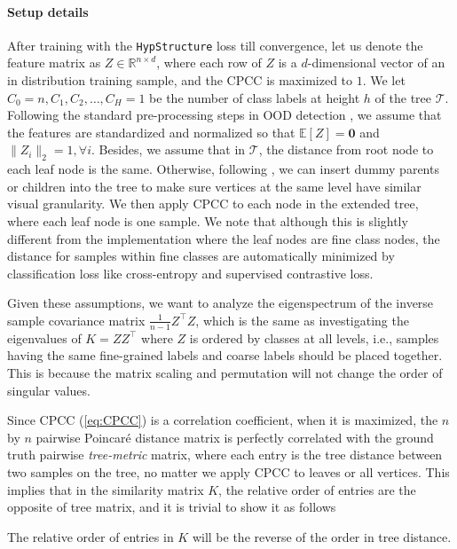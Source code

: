 \paragraph{Setup details} After training with the \texttt{HypStructure} loss till convergence, let us denote the feature matrix as $Z \in \mathbb{R}^{n \times d}$, where each row of $Z$ is a $d$-dimensional vector of an in distribution training sample, and the CPCC is maximized to $1$. We let $C_0 = n, C_1, C_2, \dots, C_H = 1$ be the number of class labels at height $h$ of the tree $\mathcal{T}$. Following the standard pre-processing steps in OOD detection \citep{2021ssd}, we assume that the features are standardized and normalized so that $\mathbb{E}[Z] = \mathbf{0}$ and $\|Z_{i}\|_2 = 1, \forall i$. Besides, we assume that in $\mathcal{T}$, the distance from root node to each leaf node is the same. Otherwise, following \citet{santurkar2021breeds}, we can insert dummy parents or children into the tree to make sure vertices at the same level have similar visual granularity. We then apply CPCC to each node in the extended tree, where each leaf node is one sample. We note that although this is slightly different from the implementation where the leaf nodes are fine class nodes, the distance for samples within fine classes are automatically minimized by classification loss like cross-entropy and supervised contrastive loss. 

Given these assumptions, we want to analyze the eigenspectrum of the inverse sample covariance matrix $\frac{1}{n-1}Z^\top Z$, which is the same as investigating the eigenvalues of $K = ZZ^\top$ where $Z$ is ordered by classes at all levels, i.e., samples having the same fine-grained labels and coarse labels should be placed together. This is because the matrix scaling and permutation will not change the order of singular values. 

Since CPCC (\cref{eq:CPCC}) is a correlation coefficient, when it is maximized, the $n$ by $n$ pairwise Poincaré distance matrix is perfectly correlated with the ground truth pairwise \emph{tree-metric} matrix, where each entry is the tree distance between two samples on the tree, no matter we apply CPCC to leaves or all vertices. This implies that in the similarity matrix $K$, the relative order of entries are the opposite of tree matrix, and it is trivial to show it as follows

\begin{lemma}
    The relative order of entries in $K$ will be the reverse of the order in tree distance.
    \label{lem:cos}
\end{lemma}

